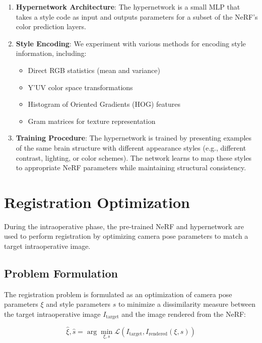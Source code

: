 \begin{enumerate}
    \item \textbf{Hypernetwork Architecture}: The hypernetwork is a small MLP that takes a style code as input and outputs parameters for a subset of the NeRF's color prediction layers.
    
    \item \textbf{Style Encoding}: We experiment with various methods for encoding style information, including:
    \begin{itemize}
        \item Direct RGB statistics (mean and variance)
        \item Y'UV color space transformations
        \item Histogram of Oriented Gradients (HOG) features
        \item Gram matrices for texture representation
    \end{itemize}
    
    \item \textbf{Training Procedure}: The hypernetwork is trained by presenting examples of the same brain structure with different appearance styles (e.g., different contrast, lighting, or color schemes). The network learns to map these styles to appropriate NeRF parameters while maintaining structural consistency.
\end{enumerate}

\section{Registration Optimization}

During the intraoperative phase, the pre-trained NeRF and hypernetwork are used to perform registration by optimizing camera pose parameters to match a target intraoperative image.

\subsection{Problem Formulation}

The registration problem is formulated as an optimization of camera pose parameters $\xi$ and style parameters $s$ to minimize a dissimilarity measure between the target intraoperative image $I_{\text{target}}$ and the image rendered from the NeRF:

\begin{equation}
    \hat{\xi}, \hat{s} = \arg\min_{\xi, s} \mathcal{L}(I_{\text{target}}, I_{\text{rendered}}(\xi, s))
\end{equation}

